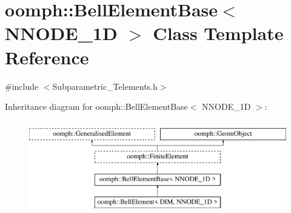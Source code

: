 \hypertarget{classoomph_1_1BellElementBase}{}\section{oomph\+:\+:Bell\+Element\+Base$<$ N\+N\+O\+D\+E\+\_\+1D $>$ Class Template Reference}
\label{classoomph_1_1BellElementBase}


{\ttfamily \#include $<$Subparametric\+\_\+\+Telements.\+h$>$}

Inheritance diagram for oomph\+:\+:Bell\+Element\+Base$<$ N\+N\+O\+D\+E\+\_\+1D $>$\+:\begin{figure}[H]
\begin{center}
\leavevmode
\includegraphics[height=4.000000cm]{classoomph_1_1BellElementBase}
\end{center}
\end{figure}
